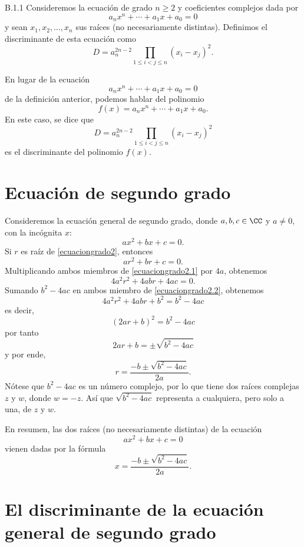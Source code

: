 \begin{definicion}{}{B.1.1}
    Consideremos la ecuación de grado $n \geq 2$ y coeficientes complejos dada por
    $$a_nx^n+\cdots +a_1x+a_0=0$$
    y sean $x_1, x_2, \dots, x_n$ sus raíces (no necesariamente distintas). Definimos el discriminante de esta ecuación como
    $$D=a_n^{2n-2}\prod_{1 \leq i < j \leq n}(x_i-x_j)^2.$$
\end{definicion}

En lugar de la ecuación
$$a_nx^n+\cdots +a_1x+a_0=0$$
de la definición anterior, podemos hablar del polinomio
$$f(x)=a_nx^n+\cdots +a_1x+a_0.$$
En este caso, se dice que
$$D=a_n^{2n-2}\prod _{1 \leq i < j \leq n}(x_i-x_j)^2$$
es el discriminante del polinomio $f(x)$.

\section{Ecuación de segundo grado}

Consideremos la ecuación general de segundo grado, donde $a, b, c \in \CC$ y $a \neq 0$, con la incógnita $x$:
\begin{equation}
    ax^2+bx+c=0. \label{ecuaciongrado2}
\end{equation}
Si $r$ es raíz de \eqref{ecuaciongrado2}, entonces
\begin{equation}
    ar^2+br+c=0. \label{ecuaciongrado2.1}
\end{equation}
Multiplicando ambos miembros de \eqref{ecuaciongrado2.1} por $4a$, obtenemos
\begin{equation*}
    4a^2r^2+4abr+4ac=0. \label{ecuaciongrado2.2}
\end{equation*}
Sumando $b^2-4ac$ en ambos miembro de \eqref{ecuaciongrado2.2}, obtenemos
$$4a^2r^2+4abr+b^2=b^2-4ac $$
es decir,
$$(2ar+b)^2 = b^2-4ac$$
por tanto
$$2ar+b = \pm \sqrt{b^2-4ac}$$
y por ende,
$$r = \frac{-b \pm \sqrt{b^2-4ac}}{2a}.$$\newpage\noindent
Nótese que $b^2-4ac$ es un número complejo, por lo que tiene dos raíces complejas $z$ y $w$, donde $w=-z$. Así que $\sqrt{b^2-4ac}$ representa a cualquiera, pero solo a una, de $z$ y $w$.

En resumen, las dos raíces (no necesariamente distintas) de la ecuación
$$ax^2+bx+c=0$$
vienen dadas por la fórmula
$$x=\frac{-b \pm \sqrt{b^2-4ac}}{2a}.$$

\section{El discriminante de la ecuación general de segundo grado}

